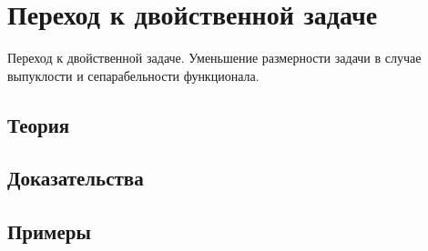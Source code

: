 
\section{Переход к двойственной задаче}
\label{sec:2.4.13-dual-problem-reduction}

\begin{ticket}
Переход к двойственной задаче. Уменьшение размерности задачи в случае выпуклости и сепарабельности функционала.
\end{ticket}

\subsection*{Теория}

\subsection*{Доказательства}

\subsection*{Примеры}
